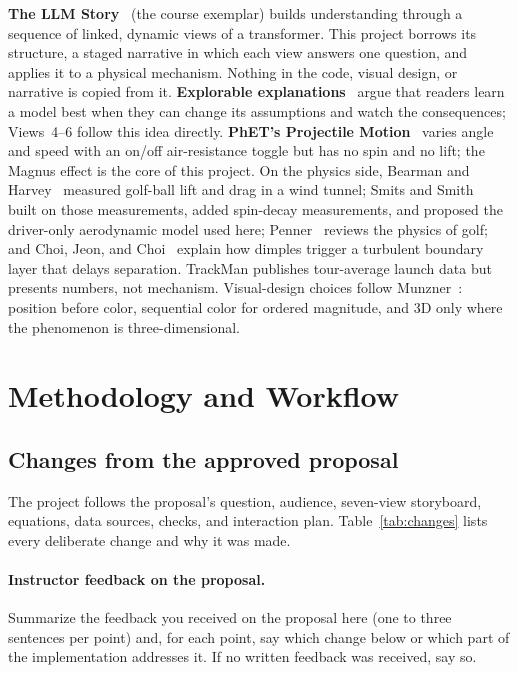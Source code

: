 \documentclass[11pt]{article}
\newcommand{\todo}[1]{\textcolor{orange!85!black}{#1}}
\begin{document}
\textbf{The LLM Story}~\cite{llmstory} (the course exemplar) builds understanding through a
sequence of linked, dynamic views of a transformer. This project borrows its structure, a staged
narrative in which each view answers one question, and applies it to a physical mechanism. Nothing
in the code, visual design, or narrative is copied from it.
\textbf{Explorable explanations}~\cite{victor2011} argue that readers learn a model best when they
can change its assumptions and watch the consequences; Views~4--6 follow this idea directly.
\textbf{PhET's Projectile Motion}~\cite{phet} varies angle and speed with an on/off air-resistance
toggle but has no spin and no lift; the Magnus effect is the core of this project.
On the physics side, Bearman and Harvey~\cite{bearman1976} measured golf-ball lift and drag in a
wind tunnel; Smits and Smith~\cite{smits1994} built on those measurements, added spin-decay
measurements, and proposed the driver-only aerodynamic model used here; Penner~\cite{penner2003}
reviews the physics of golf; and Choi, Jeon, and Choi~\cite{choi2006} explain how dimples trigger a
turbulent boundary layer that delays separation. TrackMan publishes tour-average launch data
\cite{trackman2023} but presents numbers, not mechanism. Visual-design choices follow
Munzner~\cite{munzner2014}: position before color, sequential color for ordered magnitude, and 3D
only where the phenomenon is three-dimensional.

\section{Methodology and Workflow}

\subsection{Changes from the approved proposal}\label{sec:changes}

The project follows the proposal's question, audience, seven-view storyboard, equations, data
sources, checks, and interaction plan. Table~\ref{tab:changes} lists every deliberate change and
why it was made.

\paragraph{Instructor feedback on the proposal.} \todo{Summarize the feedback you received on the
proposal here (one to three sentences per point) and, for each point, say which change below or
which part of the implementation addresses it. If no written feedback was received, say so.}
\end{document}
